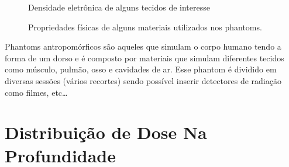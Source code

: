 \documentclass[11pt,a4paper]{article}
\begin{document}
		\begin{figure}[h]
			\centering
			\caption{Densidade eletrônica de alguns tecidos de interesse}
			\label{fig:densidadeEletronica}
		\end{figure}

		\begin{figure}[h]
			\centering
			\caption{Propriedades físicas de alguns materiais utilizados nos phantoms.}
			\label{fig:materiaisPhanton}
		\end{figure}


	Phantoms antropomórficos são aqueles que simulam o corpo humano tendo a forma de um dorso e é composto por materiais que simulam diferentes tecidos como músculo, pulmão, osso e cavidades de ar. Esse phantom é dividido em diversas sessões (vários recortes) sendo possível inserir detectores de radiação como filmes, etc\dots


	\section{Distribuição de Dose Na Profundidade}
\end{document}
